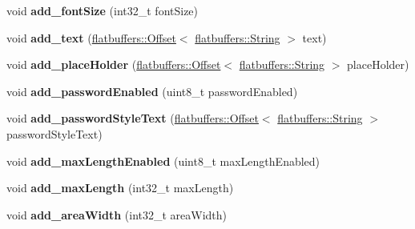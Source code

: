 \begin{DoxyCompactItemize}
void {\bfseries add\+\_\+font\+Size} (int32\+\_\+t font\+Size)
\item 
\mbox{\label{structflatbuffers_1_1TextFieldOptionsBuilder_ad5dae53b9f2f46ff1b7297856ca777f8}} 
void {\bfseries add\+\_\+text} (\hyperlink{structflatbuffers_1_1Offset}{flatbuffers\+::\+Offset}$<$ \hyperlink{structflatbuffers_1_1String}{flatbuffers\+::\+String} $>$ text)
\item 
\mbox{\label{structflatbuffers_1_1TextFieldOptionsBuilder_a8ef2f259f89c205b6cc692ac2a4fd386}} 
void {\bfseries add\+\_\+place\+Holder} (\hyperlink{structflatbuffers_1_1Offset}{flatbuffers\+::\+Offset}$<$ \hyperlink{structflatbuffers_1_1String}{flatbuffers\+::\+String} $>$ place\+Holder)
\item 
\mbox{\label{structflatbuffers_1_1TextFieldOptionsBuilder_a13907e604f0f127d5d8901b1319954e4}} 
void {\bfseries add\+\_\+password\+Enabled} (uint8\+\_\+t password\+Enabled)
\item 
\mbox{\label{structflatbuffers_1_1TextFieldOptionsBuilder_a52069341029d30072999492aebca31ce}} 
void {\bfseries add\+\_\+password\+Style\+Text} (\hyperlink{structflatbuffers_1_1Offset}{flatbuffers\+::\+Offset}$<$ \hyperlink{structflatbuffers_1_1String}{flatbuffers\+::\+String} $>$ password\+Style\+Text)
\item 
\mbox{\label{structflatbuffers_1_1TextFieldOptionsBuilder_a0a8a77a341679f7dce836d0d8ee3c4c5}} 
void {\bfseries add\+\_\+max\+Length\+Enabled} (uint8\+\_\+t max\+Length\+Enabled)
\item 
\mbox{\label{structflatbuffers_1_1TextFieldOptionsBuilder_a06c1461d501f3fd691ff0a7d14d6945d}} 
void {\bfseries add\+\_\+max\+Length} (int32\+\_\+t max\+Length)
\item 
\mbox{\label{structflatbuffers_1_1TextFieldOptionsBuilder_a5c9e9f345da5a3f51070950652c421a7}} 
void {\bfseries add\+\_\+area\+Width} (int32\+\_\+t area\+Width)
\item 

\end{DoxyCompactItemize}
